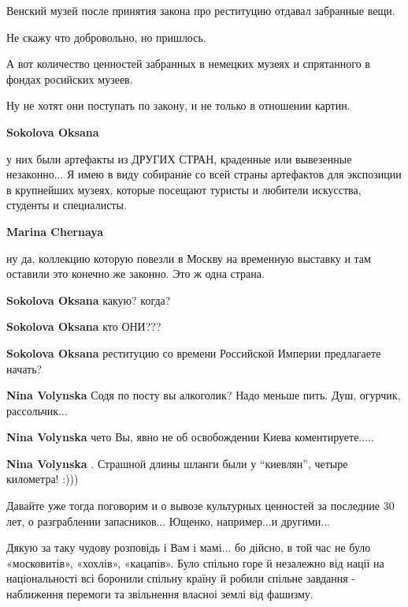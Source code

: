 \begin{itemize}
\begin{itemize}
\begin{itemize}
Венский музей после принятия закона про реституцию отдавал забранные вещи.

Не скажу что добровольно, но пришлось.

А вот количество ценностей забранных в немецких музеях и спрятанного в фондах
росийских музеев.

Ну не хотят они поступать по закону, и не только в отношении картин.

\textbf{Sokolova Oksana} 

у них были артефакты из ДРУГИХ СТРАН, краденные или вывезенные незаконно... Я
имею в виду собирание со всей страны артефактов для экспозиции в крупнейших
музеях, которые посещают туристы и любители искусства, студенты и специалисты.

\textbf{Marina Chernaya} 

ну да, коллекцию которую повезли в Москву на временную выставку и там оставили
это конечно же законно. Это ж одна страна.

\textbf{Sokolova Oksana} какую? когда?

\textbf{Sokolova Oksana} кто ОНИ???

\textbf{Sokolova Oksana} реституцию со времени Российской Империи предлагаете начать?

\end{itemize} %

\textbf{Nina Volynska} Содя по посту вы алкоголик? Надо меньше пить. Душ, огурчик, рассольчик...

\textbf{Nina Volynska} чето Вы, явно не об освобождении Киева коментируете.....

\textbf{Nina Volynska} . Страшной длины шланги были у \enquote{киевлян}, четыре километра! :)))


Давайте уже тогда поговорим и о вывозе культурных ценностей за последние 30
лет, о разграблении запасников... Ющенко, например...и другими...

\end{itemize} %


Дякую за таку чудову розповідь і Вам і мамі... бо дійсно, в той час не було
«московитів», «хохлів», «кацапів». Було спільно горе й незалежно від нації на
національності всі боронили спільну країну й робили спільне завдання -
наближення перемоги та звільнення власноі землі від фашизму.



\end{itemize}
